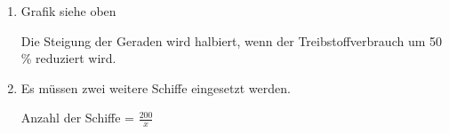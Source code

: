 \begin{langesbeispiel}
{\begin{enumerate}
	Bei einer Geschwindigkeit von 10 Knoten kann mit dem vorhandenen Treibstoff die längste Strecke, nämlich 7\,500 Seemeilen, zurückgelegt werden.
	
	\item Grafik siehe oben
	
	Die Steigung der Geraden wird halbiert, wenn der Treibstoffverbrauch um 50\,\% reduziert wird.
	
	\item Es müssen zwei weitere Schiffe eingesetzt werden.
	
	Anzahl der Schiffe = $\frac{200}{x}$	
		\end{enumerate}}
\end{langesbeispiel}
